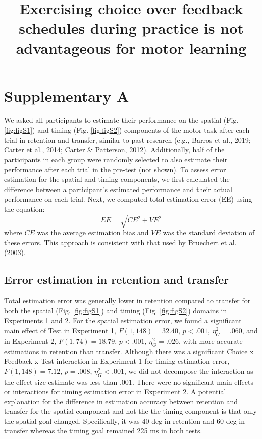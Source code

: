 \documentclass[
  man, donotrepeattitle,floatsintext]{apa7}
\title{Exercising choice over feedback schedules during practice is not advantageous for motor learning}
\author{\phantom{0}}
\date{}
\affiliation{\phantom{0}}
\begin{document}
\maketitle

\hypertarget{supplementary-a}{%
\section{Supplementary A}\label{supplementary-a}}

We asked all participants to estimate their performance on the spatial (Fig. \ref{fig:figS1}) and timing (Fig. \ref{fig:figS2}) components of the motor task after each trial in retention and transfer, similar to past research (e.g., Barros et al., 2019; Carter et al., 2014; Carter \& Patterson, 2012). Additionally, half of the participants in each group were randomly selected to also estimate their performance after each trial in the pre-test (not shown). To assess error estimation for the spatial and timing components, we first calculated the difference between a participant's estimated performance and their actual performance on each trial. Next, we computed total estimation error (EE) using the equation:
\begin{equation}
EE = \sqrt{CE^2 + VE^2}
\end{equation}
where \(CE\) was the average estimation bias and \(VE\) was the standard deviation of these errors. This approach is consistent with that used by Bruechert et al. (2003).

\hypertarget{error-estimation-in-retention-and-transfer}{%
\subsection{Error estimation in retention and transfer}\label{error-estimation-in-retention-and-transfer}}

Total estimation error was generally lower in retention compared to transfer for both the spatial (Fig. \ref{fig:figS1}) and timing (Fig. \ref{fig:figS2}) domains in Experiments 1 and 2. For the spatial estimation error, we found a significant main effect of Test in Experiment 1, \(F(1,148) = 32.40\), \(p < .001\), \(\eta_{G}^2 = .060\), and in Experiment 2, \(F(1,74) = 18.79\), \(p < .001\), \(\eta_{G}^2 = .026\), with more accurate estimations in retention than transfer. Although there was a significant Choice x Feedback x Test interaction in Experiment 1 for timing estimation error, \(F(1,148) = 7.12\), \(p = .008\), \(\eta_{G}^2 < .001\), we did not decompose the interaction as the effect size estimate was less than \(.001\). There were no significant main effects or interactions for timing estimation error in Experiment 2. A potential explanation for the difference in estimation accuracy between retention and transfer for the spatial component and not the the timing component is that only the spatial goal changed. Specifically, it was 40 deg in retention and 60 deg in transfer whereas the timing goal remained 225 ms in both tests.
\end{document}
